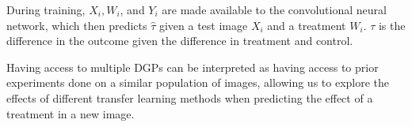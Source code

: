 During training, $X_i, W_i$, and $Y_i$ are made available to the convolutional neural network, which then predicts $\hat{\tau}$ given a test image $X_i$ and a treatment $W_i$. $\tau$ is the difference in the outcome given the difference in treatment and control.

Having access to multiple DGPs can be interpreted as having access to prior experiments done on a similar population of images, allowing us to explore the effects of different transfer learning methods when predicting the effect of a treatment in a new image.



